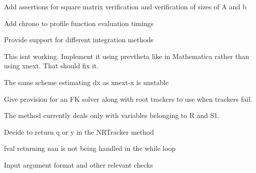 
\begin{DoxyRefList}
\item[Member \mbox{\hyperlink{utils_8hh_a7ed506e6d7b8ba153e1b8b24a7b6e5c4}{linear\+Solve}} (Matrix\+Xd Amat, Vector\+Xd bvec)]\label{todo__todo000006}%
%
Add assertions for square matrix verification and verification of sizes of A and b  
\item[Class \mbox{\hyperlink{classRootTracker}{Root\+Tracker}} ]\label{todo__todo000005}%
%
Add chrono to profile function evaluation timings  
\item[Member \mbox{\hyperlink{classRootTracker_acc5d4b8e89ace70cee9c227f033e5a92}{Root\+Tracker::D\+M\+Tracker}} (Vector\+Xd xprev, Vector\+Xd x, Vector\+Xd y, std\+::function$<$ Matrix\+Xd(\+Vector\+Xd)$>$ Jfx, std\+::function$<$ Matrix\+Xd(\+Vector\+Xd)$>$ Jfy, double eps=0, std\+::function$<$ Vector\+Xd(\+Vector\+Xd)$>$ f=N\+U\+LL)]\label{todo__todo000003}%
%
Provide support for different integration methods 

This isnt working. Implement it using prevtheta like in Mathematica rather than using xnext. That should fix it. 

The same scheme estimating dx as xnext-\/x is unstable  
\item[Member \mbox{\hyperlink{classRootTracker_a0d29be3a24392b6a864b8e471f23db6c}{Root\+Tracker::Methods}} ()]\label{todo__todo000001}%
%
Give provision for an FK solver along with root trackers to use when trackers fail.  
\item[Member \mbox{\hyperlink{classRootTracker_a115ac4873425537fdeacbbdaf1f3e9fd}{Root\+Tracker::N\+N\+Tracker}} (Vector\+Xd ys, Vector\+Xd ysols)]\label{todo__todo000004}%
%
The method currently deals only with variables belonging to R and S1.  
\item[Member \mbox{\hyperlink{classRootTracker_a6bb3dcb73ea58ac44ab15d7803de3d5a}{Root\+Tracker::N\+R\+Tracker}} (Vector\+Xd x, Vector\+Xd y, std\+::function$<$ Vector\+Xd(\+Vector\+Xd)$>$ f, std\+::function$<$ Matrix\+Xd(\+Vector\+Xd)$>$ Jfy, double eps=pow(10, -\/10))]\label{todo__todo000002}%
%
Decide to return q or y in the N\+R\+Tracker method 

fval returning nan is not being handled in the while loop 

Input argument format and other relevant checks 
\end{DoxyRefList}